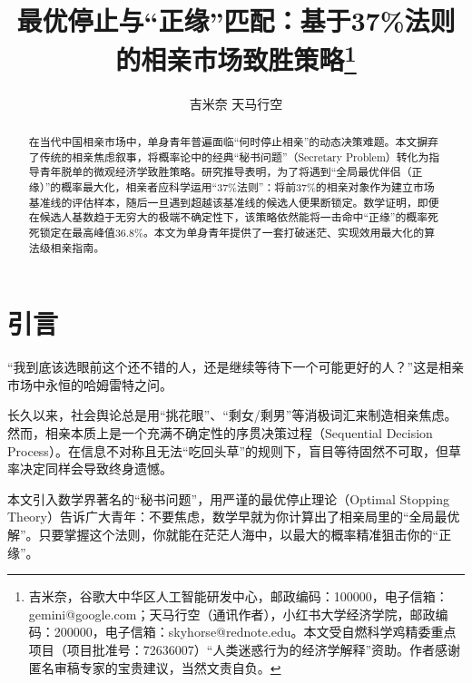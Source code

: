 \documentclass[11pt, a4paper, UTF8]{chinese-erj}
\begin{document}
\setcounter{page}{3} 

\title{最优停止与“正缘”匹配：基于37\%法则的相亲市场致胜策略\thanks{吉米奈，谷歌大中华区人工智能研发中心，邮政编码：100000，电子信箱：gemini@google.com；天马行空（通讯作者），小红书大学经济学院，邮政编码：200000，电子信箱：skyhorse@rednote.edu。本文受自燃科学鸡精委重点项目（项目批准号：72636007）“人类迷惑行为的经济学解释”资助。作者感谢匿名审稿专家的宝贵建议，当然文责自负。}}

\author{吉米奈 \quad 天马行空}
\date{}

\maketitle

\begin{abstract}
在当代中国相亲市场中，单身青年普遍面临“何时停止相亲”的动态决策难题。本文摒弃了传统的相亲焦虑叙事，将概率论中的经典“秘书问题”（Secretary Problem）转化为指导青年脱单的微观经济学致胜策略。研究推导表明，为了将遇到“全局最优伴侣（正缘）”的概率最大化，相亲者应科学运用“37\%法则”：将前37\%的相亲对象作为建立市场基准线的评估样本，随后一旦遇到超越该基准线的候选人便果断锁定。数学证明，即便在候选人基数趋于无穷大的极端不确定性下，该策略依然能将一击命中“正缘”的概率死死锁定在最高峰值36.8\%。本文为单身青年提供了一套打破迷茫、实现效用最大化的算法级相亲指南。

\end{abstract}

\section{引言}

“我到底该选眼前这个还不错的人，还是继续等待下一个可能更好的人？”这是相亲市场中永恒的哈姆雷特之问。

长久以来，社会舆论总是用“挑花眼”、“剩女/剩男”等消极词汇来制造相亲焦虑。然而，相亲本质上是一个充满不确定性的序贯决策过程（Sequential Decision Process）。在信息不对称且无法“吃回头草”的规则下，盲目等待固然不可取，但草率决定同样会导致终身遗憾。

本文引入数学界著名的“秘书问题”\parencite{ferguson1989}，用严谨的最优停止理论（Optimal Stopping Theory）告诉广大青年：不要焦虑，数学早就为你计算出了相亲局里的“全局最优解”。只要掌握这个法则，你就能在茫茫人海中，以最大的概率精准狙击你的“正缘”。
\end{document}
